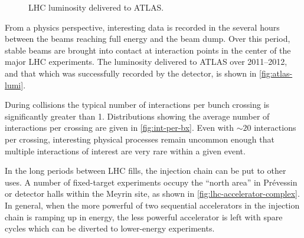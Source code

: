 \begin{figure}
  \caption[LHC Luminosity Delivered to ATLAS]{%
    LHC luminosity delivered to ATLAS.}
\end{figure}

From a physics perspective, interesting data is recorded in the several hours between the beams reaching full energy and the beam dump.
Over this period, stable beams are brought into contact at interaction points in the center of the major LHC experiments.
The luminosity delivered to ATLAS over 2011--2012, and that which was successfully recorded by the detector, is shown in \cref{fig:atlas-lumi}.

During collisions the typical number of interactions per bunch crossing is significantly greater than 1. Distributions showing the average number of interactions per crossing are given in \cref{fig:int-per-bx}.
Even with $\sim 20$ interactions per crossing, interesting physical processes remain uncommon enough that multiple interactions of interest are very rare within a given event.


In the long periods between LHC fills, the injection chain can be put to other uses.
A number of fixed-target experiments occupy the ``north area'' in Pr\'evessin or detector halls within the Meyrin site, as shown in \cref{fig:lhc-accelerator-complex}.
In general, when the more powerful of two sequential accelerators in the injection chain is ramping up in energy, the less powerful accelerator is left with spare cycles which can be diverted to lower-energy experiments.

